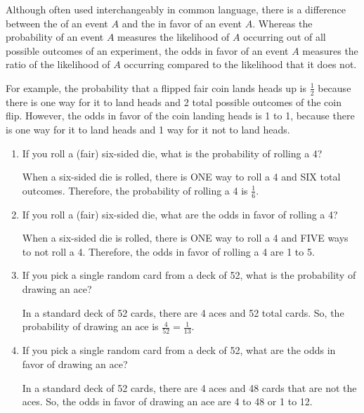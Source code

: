 \documentclass{ccg-topic}
\begin{document}
    \begin{todo}[]
        Although often used interchangeably in common language, there is a difference between the  of an event $A$ and the  in favor of an event $A$.  Whereas the probability of an event $A$ measures the likelihood of $A$ occurring out of all possible outcomes of an experiment, the odds in favor of an event $A$ measures the ratio of the likelihood of $A$ occurring compared to the likelihood that it does not. 
        
        For example, the probability that a flipped fair coin lands heads up is $\frac{1}{2}$ because there is one way for it to land heads and 2 total possible outcomes of the coin flip.  However, the odds in favor of the coin landing heads is 1 to 1, because there is one way for it to land heads and 1 way for it not to land heads.
        	\begin{enumerate}
        	\item If you roll a (fair) six-sided die, what is the probability of rolling a 4? 
        
        	{\answer When a six-sided die is rolled, there is ONE way to roll a 4 and SIX total outcomes.  Therefore, the probability of rolling a 4 is $\frac{1}{6}$. } 
        
        	\item If you roll a (fair) six-sided die, what are the odds in favor of rolling a 4? 
        
        	{\answer When a six-sided die is rolled, there is ONE way to roll a 4 and FIVE ways to not roll a 4.  Therefore, the odds in favor of rolling a 4 are 1 to 5. } 
        
        	\item If you pick a single random card from a deck of 52, what is the probability of drawing an ace? 
        
        	{\answer In a standard deck of 52 cards, there are 4 aces and 52 total cards.  So, the probability of drawing an ace is $\frac{4}{52} = \frac{1}{13}$.} 
        
        	\item If you pick a single random card from a deck of 52, what are the odds in favor of drawing an ace? 
        
        	{\answer In a standard deck of 52 cards, there are 4 aces and 48 cards that are not the aces.  So, the odds in favor of drawing an ace are 4 to 48 or 1 to 12.} 
        
            \end{enumerate}
    \end{todo}
    
\end{document}
